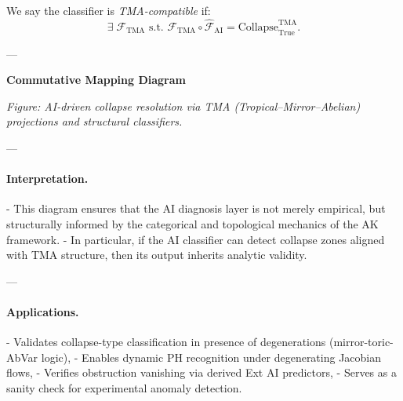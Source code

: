\documentclass[11pt]{article}
\begin{document}
\begin{axiom}
\begin{axiom}
{{We say the classifier is \emph{TMA-compatible} if:
\[
\exists \; \mathcal{F}_{\mathrm{TMA}} \text{ s.t. } \mathcal{F}_{\mathrm{TMA}} \circ \widehat{\mathcal{F}}_{\text{AI}} = \text{Collapse}^{\mathrm{TMA}}_{\text{True}}.
\]

---

\vspace{1.5em}
\noindent\textbf{Commutative Mapping Diagram}

\vspace{0.5em}
\noindent
\begin{minipage}{\textwidth}
\centering
{}
\vspace{0.5em}

\small\textit{Figure: AI-driven collapse resolution via TMA (Tropical–Mirror–Abelian) projections and structural classifiers.}
\end{minipage}


---

\paragraph{Interpretation.}

- This diagram ensures that the AI diagnosis layer is not merely empirical, but structurally informed by  
the categorical and topological mechanics of the AK framework.
- In particular, if the AI classifier can detect collapse zones aligned with TMA structure,  
then its output inherits analytic validity.

---

\paragraph{Applications.}

- Validates collapse-type classification in presence of degenerations (mirror-toric-AbVar logic),
- Enables dynamic PH recognition under degenerating Jacobian flows,
- Verifies obstruction vanishing via derived Ext AI predictors,
- Serves as a sanity check for experimental anomaly detection.

}}
\end{axiom}
\end{axiom}
\end{document}
